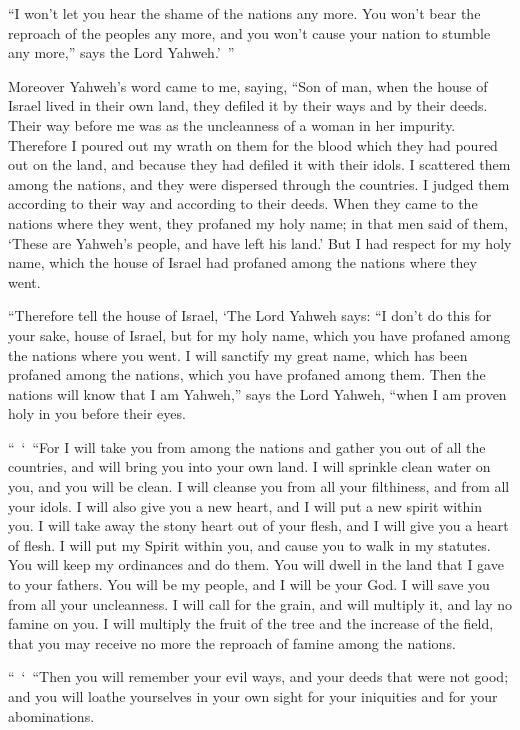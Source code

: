 {“I won’t let you hear the shame of the nations any more. You won’t bear the reproach of the peoples any more, and you won’t cause your nation to stumble any more,” says the Lord Yahweh.’ ”
\par }{\PP {}Moreover Yahweh’s word came to me, saying,
“Son of man, when the house of Israel lived in their own land, they defiled it by their ways and by their deeds. Their way before me was as the uncleanness of a woman in her impurity.
Therefore I poured out my wrath on them for the blood which they had poured out on the land, and because they had defiled it with their idols.
I scattered them among the nations, and they were dispersed through the countries. I judged them according to their way and according to their deeds.
When they came to the nations where they went, they profaned my holy name; in that men said of them, ‘These are Yahweh’s people, and have left his land.’
But I had respect for my holy name, which the house of Israel had profaned among the nations where they went.
\par }{\PP {}“Therefore tell the house of Israel, ‘The Lord Yahweh says: “I don’t do this for your sake, house of Israel, but for my holy name, which you have profaned among the nations where you went.
I will sanctify my great name, which has been profaned among the nations, which you have profaned among them. Then the nations will know that I am Yahweh,” says the Lord Yahweh, “when I am proven holy in you before their eyes.
\par }{\PP {}“ ‘ “For I will take you from among the nations and gather you out of all the countries, and will bring you into your own land.
I will sprinkle clean water on you, and you will be clean. I will cleanse you from all your filthiness, and from all your idols.
I will also give you a new heart, and I will put a new spirit within you. I will take away the stony heart out of your flesh, and I will give you a heart of flesh.
I will put my Spirit within you, and cause you to walk in my statutes. You will keep my ordinances and do them.
You will dwell in the land that I gave to your fathers. You will be my people, and I will be your God.
I will save you from all your uncleanness. I will call for the grain, and will multiply it, and lay no famine on you.
I will multiply the fruit of the tree and the increase of the field, that you may receive no more the reproach of famine among the nations.
\par }{\PP {}“ ‘ “Then you will remember your evil ways, and your deeds that were not good; and you will loathe yourselves in your own sight for your iniquities and for your abominations.
}
